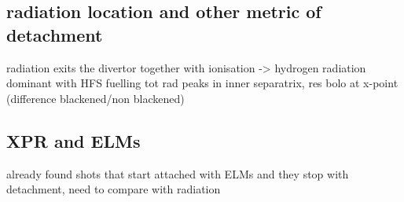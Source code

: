 \subsection{radiation location and other metric of detachment}
radiation exits the divertor together with ionisation -> hydrogen radiation dominant
with HFS fuelling tot rad peaks in inner separatrix, res bolo at x-point (difference blackened/non blackened)
\subsection{XPR and ELMs}
already found shots that start attached with ELMs and they stop with detachment, need to compare with radiation
